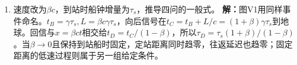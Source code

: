 \documentclass[UTF8,fontset=fandol,a4paper,11pt]{ctexart}
\begin{document}
\begin{enumerate}
\item 速度改为$\beta c$，到站时船钟增量为$\tau_s$，推导四问的一般式。
\textbf{解：}图V1用同样事件命名。$t_B=\gamma\tau_s,L=\beta c\gamma\tau_s$，向后信号在$t_C=t_B+L/c=(1+\beta)\gamma\tau_s$到地球。回信与$x=\beta ct$相交给$t_D=t_C/(1-\beta)$，所以$\tau_D=\tau_s(1+\beta)/(1-\beta)$。当$\beta\to0$且保持到站船时固定，定站距离同时趋零，往返延迟也趋零；固定距离的低速过程则属于另一组给定条件。
\begin{center}\begin{minipage}{.98\linewidth}\centering
{}
\end{minipage}
\end{center}
\end{enumerate}
\end{document}
